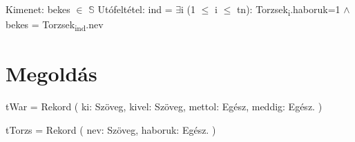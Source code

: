 \documentclass[12pt]{report}
\begin{document}
\vspace{5mm}
\begin{Large}
\color{BlueB}{TT feladat}
\end{Large}
\vspace{2mm}

Kimenet: bekes $\in$ $\mathbb{S}$\newline
Utófeltétel: ind = $\exists$i (1 $\le$ i $\le$ tn): Torzsek\textsubscript{i}.haboruk=1 $\wedge$ bekes = Torzsek\textsubscript{ind}.nev
\section{Megoldás}
\begin{Large}
\color{BlueB}{Programparaméterek}
\end{Large}
\vspace{5mm}

\begin{large}
\end{large}
\vspace{2mm}

tWar = Rekord (\newline
\-\hspace{2.3cm} ki: \-\hspace{0.88cm}Szöveg,\newline
\-\hspace{2.3cm} kivel:  \-\hspace{0.4cm}Szöveg,\newline
\-\hspace{2.3cm} mettol: \-\hspace{0.18cm}Egész,\newline
\-\hspace{2.3cm} meddig: Egész.\newline
)

tTorzs = Rekord (\newline
\-\hspace{2.3cm} nev: \-\hspace{0.88cm}Szöveg,\newline
\-\hspace{2.3cm} haboruk:  \-\hspace{0.1cm}Egész.\newline
)

\vspace{5mm}

\begin{large}
\end{large}
\vspace{2mm}
\end{document}
